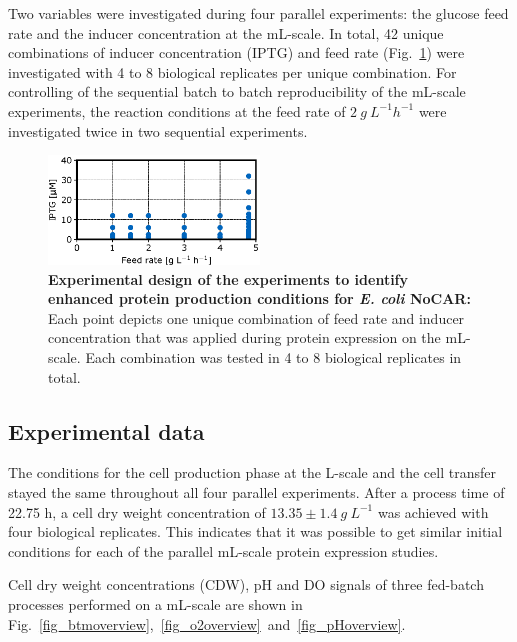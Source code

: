 \documentclass[sn-standardnature]{sn-jnl}%
\theoremstyle{thmstyleone}%
\theoremstyle{thmstyletwo}%
\theoremstyle{thmstylethree}%
\begin{document}
Two variables were investigated during four parallel experiments: the glucose feed rate and the inducer concentration at the mL-scale.
In total, 42 unique combinations of inducer concentration (IPTG) and feed rate (Fig.~\ref{fig_expdesign}) were investigated with 4 to 8 biological replicates per unique combination.
For controlling of the sequential batch to batch reproducibility of the mL-scale experiments, the reaction conditions at the feed rate of 
$2\ g\ L^{-1}h^{-1}$ were investigated twice in two sequential experiments.

\begin{figure}[H]
    \centering
    \includegraphics[width=0.5\textwidth]{figures/Fig1.eps}
    \caption{
        \textbf{Experimental design of the experiments to identify enhanced protein production conditions for \textit{E. coli} NoCAR:}
        Each point depicts one unique combination of feed rate and inducer concentration that was applied during protein expression on the mL-scale.
        Each combination was tested in 4 to 8 biological replicates in total.
    }
    \label{fig_expdesign}
\end{figure}

\subsection{Experimental data}
The conditions for the cell production phase at the L-scale and the cell transfer stayed the same throughout all four parallel experiments.
After a process time of 22.75 h, a cell dry weight concentration of $13.35 \pm 1.4\ g\ L^{-1}$ was achieved with four biological replicates.
This indicates that it was possible to get similar initial conditions for each of the parallel mL-scale protein expression studies.

Cell dry weight concentrations (CDW), pH and DO signals of three fed-batch processes performed on a mL-scale are shown in Fig.~\ref{fig_btmoverview},~\ref{fig_o2overview}~and~\ref{fig_pHoverview}.
\end{document}
